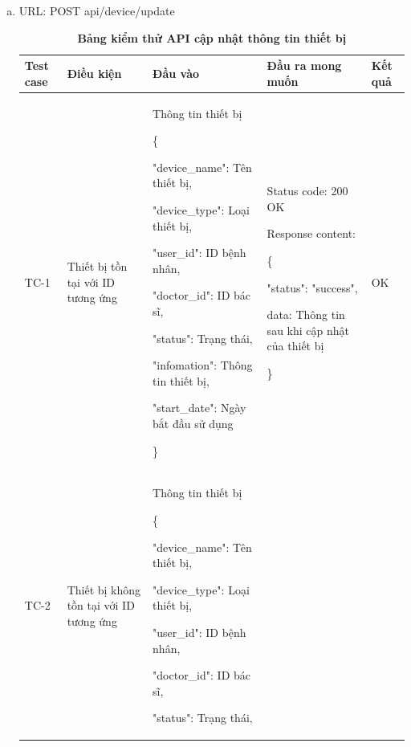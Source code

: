 \begin{enumerate}[a)]
  \item URL: POST api/device/update
  
  \begin{xltabular}{\textwidth}{
    | >{\raggedright\arraybackslash}p{1cm}
    | >{\raggedright\arraybackslash}p{2.5cm}
    | >{\raggedright\arraybackslash}X
    | >{\raggedright\arraybackslash}X
    | >{\raggedright\arraybackslash}p{1cm}|
    }
    \caption{\bfseries \fontsize{12pt}{0pt}\selectfont Bảng kiểm thử API cập nhật thông tin thiết bị}
    \\
    \hline
    \bfseries Test case    &\bfseries Điều kiện   &\bfseries Đầu vào 
    &\bfseries Đầu ra mong muốn &\bfseries Kết quả\\ \hline
  
  
    TC-1
    & Thiết bị tồn tại với ID tương ứng
    & Thông tin thiết bị

    \{

    "device\_name": Tên thiết bị,

    "device\_type": Loại thiết bị,

    "user\_id": ID bệnh nhân,

    "doctor\_id": ID bác sĩ,

    "status": Trạng thái,

    "infomation": Thông tin thiết bị,

    "start\_date": Ngày bắt đầu sử dụng

   \}
    & 
  
    Status code: 200 OK
  
      Response content:
  
      \{
  
    "status": "success",
  
    data: Thông tin sau khi cập nhật của thiết bị
  
    \}
    
    & OK
  
    \\ \hline
  
    TC-2
    & Thiết bị không tồn tại với ID tương ứng
    & Thông tin thiết bị

    \{

    "device\_name": Tên thiết bị,

    "device\_type": Loại thiết bị,

    "user\_id": ID bệnh nhân,

    "doctor\_id": ID bác sĩ,

    "status": Trạng thái,


\end{xltabular}
\end{enumerate}

